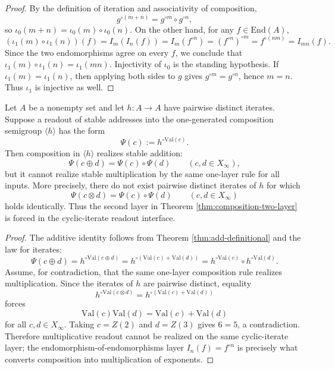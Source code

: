 \begin{proof}
By the definition of iteration and associativity of composition,
\[
g^{\circ(m+n)}=g^{\circ m}\circ g^{\circ n},
\]
so \(\iota_0(m+n)=\iota_0(m)\circ \iota_0(n)\). On the other hand, for any \(f\in\mathrm{End}(A)\),
\[
(\iota_1(m)\circ \iota_1(n))(f)
=I_m(I_n(f))
=I_m(f^{\circ n})
=(f^{\circ n})^{\circ m}
=f^{\circ(nm)}
=I_{mn}(f).
\]
Since the two endomorphisms agree on every \(f\), we conclude that \(\iota_1(m)\circ \iota_1(n)=\iota_1(mn)\). Injectivity of \(\iota_0\) is the standing hypothesis. If \(\iota_1(m)=\iota_1(n)\), then applying both sides to \(g\) gives \(g^{\circ m}=g^{\circ n}\), hence \(m=n\). Thus \(\iota_1\) is injective as well.
\end{proof}

\begin{theorem}\label{thm:one-layer-composition-obstruction}
Let \(A\) be a nonempty set and let \(h:A\to A\) have pairwise distinct iterates. Suppose a readout of stable addresses into the one-generated composition semigroup \(\langle h\rangle\) has the form
\[
\Psi(c):=h^{\circ\mathrm{Val}(c)}.
\]
Then composition in \(\langle h\rangle\) realizes stable addition:
\[
\Psi(c\oplus d)=\Psi(c)\circ\Psi(d)
\qquad(c,d\in X_\infty),
\]
but it cannot realize stable multiplication by the same one-layer rule for all inputs. More precisely, there do not exist pairwise distinct iterates of \(h\) for which
\[
\Psi(c\otimes d)=\Psi(c)\circ\Psi(d)
\qquad(c,d\in X_\infty)
\]
holds identically. Thus the second layer in Theorem \ref{thm:composition-two-layer} is forced in the cyclic-iterate readout interface.
\end{theorem}

\begin{proof}
The additive identity follows from Theorem \ref{thm:add-definitional} and the law for iterates:
\[
\Psi(c\oplus d)
=h^{\circ\mathrm{Val}(c\oplus d)}
=h^{\circ(\mathrm{Val}(c)+\mathrm{Val}(d))}
=h^{\circ\mathrm{Val}(c)}\circ h^{\circ\mathrm{Val}(d)}.
\]
Assume, for contradiction, that the same one-layer composition rule realizes multiplication. Since the iterates of \(h\) are pairwise distinct, equality
\[
h^{\circ\mathrm{Val}(c\otimes d)}=h^{\circ(\mathrm{Val}(c)+\mathrm{Val}(d))}
\]
forces
\[
\mathrm{Val}(c)\mathrm{Val}(d)=\mathrm{Val}(c)+\mathrm{Val}(d)
\]
for all \(c,d\in X_\infty\). Taking \(c=Z(2)\) and \(d=Z(3)\) gives \(6=5\), a contradiction. Therefore multiplicative readout cannot be realized on the same cyclic-iterate layer; the endomorphism-of-endomorphisms layer \(I_n(f)=f^{\circ n}\) is precisely what converts composition into multiplication of exponents.
\end{proof}

